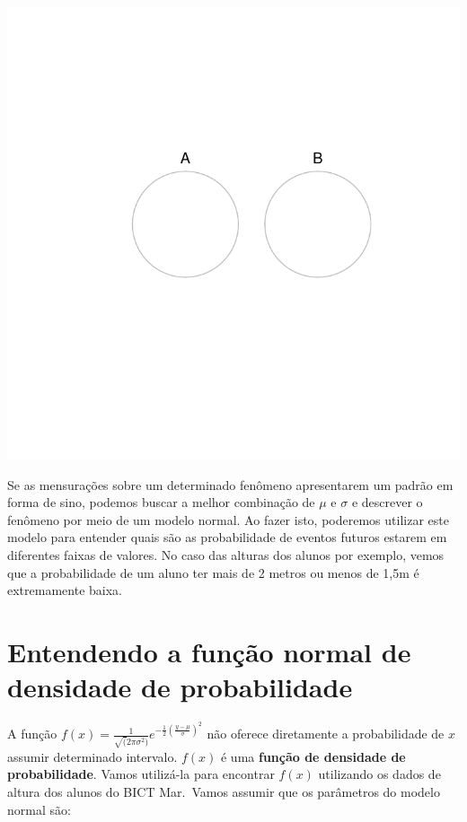 \documentclass[
]{book}
\begin{document}
\begin{center}\includegraphics{probest-cambientais_files/figure-latex/unnamed-chunk-188-1} \end{center}

Se as mensurações sobre um determinado fenômeno apresentarem um padrão em forma de sino, podemos buscar a melhor combinação de \(\mu\) e \(\sigma\) e descrever o fenômeno por meio de um modelo normal. Ao fazer isto, poderemos utilizar este modelo para entender quais são as probabilidade de eventos futuros estarem em diferentes faixas de valores. No caso das alturas dos alunos por exemplo, vemos que a probabilidade de um aluno ter mais de 2 metros ou menos de 1,5m é extremamente baixa.

\hypertarget{entendendo-a-funuxe7uxe3o-normal-de-densidade-de-probabilidade}{%
\section{Entendendo a função normal de densidade de probabilidade}\label{entendendo-a-funuxe7uxe3o-normal-de-densidade-de-probabilidade}}

A função \(f(x) = \frac{1}{\sqrt(2\pi\sigma^2)}e^{-\frac{1}{2}(\frac{y-\mu}{\sigma})^2}\) não oferece diretamente a probabilidade de \(x\) assumir determinado intervalo. \(f(x)\) é uma \textbf{função de densidade de probabilidade}. Vamos utilizá-la para encontrar \(f(x)\) utilizando os dados de altura dos alunos do BICT Mar.~Vamos assumir que os parâmetros do modelo normal são:
\end{document}
